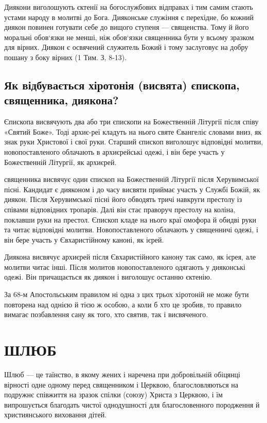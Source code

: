 \documentclass[main.tex]{subfiles}
\begin{document}
Диякони виголошують єктенії на богослужбових відправах і тим самим стають устами народу в молитві до Бога. Дияконське служіння є перехідне, бо кожний диякон повинен готувати себе до вищого ступеня — священства. Тому й його моральні обов`язки не менші, ніж обов`язки священника бути у всьому зразком для вірних. Диякон є освячений служитель Божий і тому заслуговує на добру пошану з боку вірних (1 Тим. З, 8-13).

\subsection{Як відбувається хіротонія (висвята) єпископа, священника, диякона?}

Єпископа висвячують два або три єпископи на Божественній Літургії після співу «Святий Боже». Тоді архиє-реї кладуть на нього святе Євангеліє словами вниз, як знак руки Христової і свої руки. Старший єпископ виголошує відповідні молитви, новопоставленого облачають в архиєрейські одежі, і він бере участь у Божественній Літургії, як архиєрей.

священника висвячує один єпископ на Божественній Літургії після Херувимської пісні. Кандидат є дияконом і до часу висвяти приймає участь у Службі Божій, як диякон. Після Херувимської пісні його обводять тричі навкруги престолу із співами відповідних тропарів. Далі він стає праворуч престолу на коліна, поклавши руки на престол. Єпископ кладе на нього краї омофора й обидві руки та читає відповідні молитви. Новопоставленого облачають у священничі одежі, і він бере участь у Євхаристійному каноні, як ієрей.

Диякона висвячує архиєрей після Євхаристійного канону так само, як ієрея, але молитви читає інші. Після молитов новопоставленого одягають у дияконські одежі. Він причащається як диякон і виголошує останню єктенію.

За 68-м Апостольським правилом ні одна з цих трьох хіротоній не може бути повторена над однією й тією ж особою, а коли б хто це зробив, то правило вимагає позбавлення сану як того, хто святив, так і висвяченого.

\section{ШЛЮБ}

Шлюб — це таїнство, в якому жених і наречена при добровільній обіцянці вірності одне одному перед священником і Церквою, благословляються на подружнє співжиття на зразок спілки (союзу) Христа з Церквою, і їм випрошується благодать чистої однодушності для благословенного породження й християнського виховання дітей.
\end{document}
